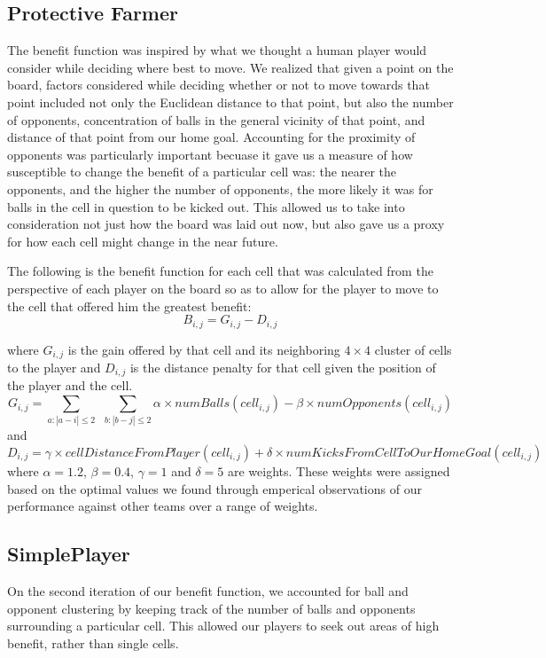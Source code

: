 \documentclass[
10pt, %
letterpaper, %
oneside, %
headinclude,footinclude, %
english
]{article}
\begin{document}
\subsection{Protective Farmer}
The benefit function was inspired by what we thought a human player would consider while deciding where best to move. We realized that given a point on the board, factors considered while deciding whether or not to move towards that point included not only the Euclidean distance to that point, but also the number of opponents, concentration of balls in the general vicinity of that point, and distance of that point from our home goal. Accounting for the proximity of opponents was particularly important becuase it gave us a measure of how susceptible to change the benefit of a particular cell was: the nearer the opponents, and the higher the number of opponents, the more likely it was for balls in the cell in question to be kicked out. This allowed us to take into consideration not just how the board was laid out now, but also gave us a proxy for how each cell might change in the near future.

The following is the benefit function for each cell that was calculated from the perspective of each player on the board so as to allow for the player to move to the cell that offered him the greatest benefit:
$$B_{i, j} = G_{i, j} - D_{i,j} $$

where $G_{i, j}$ is the gain offered by that cell and its neighboring $4 \times 4$ cluster of cells to the player and $D_{i, j}$ is the distance penalty for that cell given the position of the player and the cell. $$G_{i, j} = \sum_{a : |a - i| \leq 2}\ \ \sum_{b : |b - j| \leq 2} \alpha \times numBalls(cell_{i, j}) - \beta \times numOpponents(cell_{i,j}) $$ and $$D_{i, j} = \gamma \times cellDistanceFromPlayer(cell_{i,j}) + \delta \times numKicksFromCellToOurHomeGoal(cell_{i, j})$$ where $\alpha = 1.2$, $\beta = 0.4$, $\gamma = 1$ and $\delta = 5$ are weights. These weights were assigned based on the optimal values we found through emperical observations of our performance against other teams over a range of weights.

\subsection{SimplePlayer}
On the second iteration of our benefit function, we accounted for ball and opponent clustering by keeping track of the number of balls and opponents surrounding a particular cell. This allowed our players to seek out areas of high benefit, rather than single cells.
\end{document}
